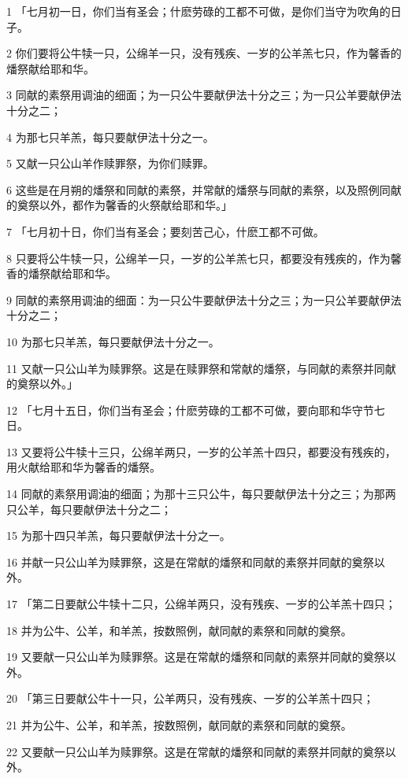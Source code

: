 \par 1 「七月初一日，你们当有圣会；什麽劳碌的工都不可做，是你们当守为吹角的日子。
\par 2 你们要将公牛犊一只，公绵羊一只，没有残疾、一岁的公羊羔七只，作为馨香的燔祭献给耶和华。
\par 3 同献的素祭用调油的细面；为一只公牛要献伊法十分之三；为一只公羊要献伊法十分之二；
\par 4 为那七只羊羔，每只要献伊法十分之一。
\par 5 又献一只公山羊作赎罪祭，为你们赎罪。
\par 6 这些是在月朔的燔祭和同献的素祭，并常献的燔祭与同献的素祭，以及照例同献的奠祭以外，都作为馨香的火祭献给耶和华。」
\par 7 「七月初十日，你们当有圣会；要刻苦己心，什麽工都不可做。
\par 8 只要将公牛犊一只，公绵羊一只，一岁的公羊羔七只，都要没有残疾的，作为馨香的燔祭献给耶和华。
\par 9 同献的素祭用调油的细面：为一只公牛要献伊法十分之三；为一只公羊要献伊法十分之二；
\par 10 为那七只羊羔，每只要献伊法十分之一。
\par 11 又献一只公山羊为赎罪祭。这是在赎罪祭和常献的燔祭，与同献的素祭并同献的奠祭以外。」
\par 12 「七月十五日，你们当有圣会；什麽劳碌的工都不可做，要向耶和华守节七日。
\par 13 又要将公牛犊十三只，公绵羊两只，一岁的公羊羔十四只，都要没有残疾的，用火献给耶和华为馨香的燔祭。
\par 14 同献的素祭用调油的细面；为那十三只公牛，每只要献伊法十分之三；为那两只公羊，每只要献伊法十分之二；
\par 15 为那十四只羊羔，每只要献伊法十分之一。
\par 16 并献一只公山羊为赎罪祭，这是在常献的燔祭和同献的素祭并同献的奠祭以外。
\par 17 「第二日要献公牛犊十二只，公绵羊两只，没有残疾、一岁的公羊羔十四只；
\par 18 并为公牛、公羊，和羊羔，按数照例，献同献的素祭和同献的奠祭。
\par 19 又要献一只公山羊为赎罪祭。这是在常献的燔祭和同献的素祭并同献的奠祭以外。
\par 20 「第三日要献公牛十一只，公羊两只，没有残疾、一岁的公羊羔十四只；
\par 21 并为公牛、公羊，和羊羔，按数照例，献同献的素祭和同献的奠祭。
\par 22 又要献一只公山羊为赎罪祭。这是在常献的燔祭和同献的素祭并同献的奠祭以外。
